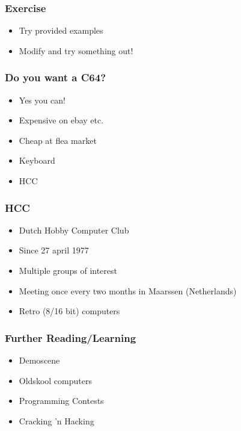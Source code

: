 \documentclass[aspectratio=43]{uva-inf-presentation}
\begin{document}

\begin{frame}
\frametitle{Exercise}

\begin{itemize}
\item Try provided examples
\item Modify and try something out!
\end{itemize}

\end{frame}


\begin{frame}
\frametitle{Do you want a C64?}

\begin{itemize}
\item Yes you can!
\item Expensive on ebay etc.
\item Cheap at flea market
\item Keyboard
\item HCC
\end{itemize}

\end{frame}


\begin{frame}
\frametitle{HCC}

\begin{itemize}
\item Dutch Hobby Computer Club
\item Since 27 april 1977
\item Multiple groups of interest
\item Meeting once every two months in Maarssen (Netherlands)
\item Retro (8/16 bit) computers
\end{itemize}

\end{frame}


\begin{frame}
\frametitle{Further Reading/Learning}

\begin{itemize}
\item Demoscene
\item Oldskool computers
\item Programming Contests
\item Cracking 'n Hacking
\end{itemize}

\end{frame}
\end{document}
